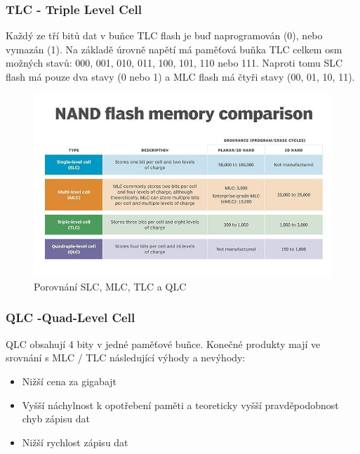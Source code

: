 \subsubsection{TLC - Triple Level Cell}
Každý ze tří bitů dat v buňce TLC flash je buď naprogramován (0), nebo vymazán (1). Na základě úrovně napětí má paměťová buňka TLC celkem osm možných stavů: 000, 001, 010, 011, 100, 101, 110 nebo 111. Naproti tomu SLC flash má pouze dva stavy (0 nebo 1) a MLC flash má čtyři stavy (00, 01, 10, 11).  
    \begin{figure}[h]
   \begin{center}
     \includegraphics[scale=0.6]{images/TLC.png}
   \end{center}
   \caption{Porovnání SLC, MLC, TLC a QLC}
  \end{figure} 
\pagebreak   
\subsubsection{QLC -Quad-Level Cell}
QLC obsahují 4 bity v jedné paměťové buňce.
Konečné produkty mají ve srovnání s MLC / TLC následující výhody a nevýhody:
\begin{itemize}
\item Nižší cena za gigabajt
\item Vyšší náchylnost k opotřebení paměti a teoreticky vyšší pravděpodobnost chyb zápisu dat
\item Nižší rychlost zápisu dat
\end{itemize}
\pagebreak
